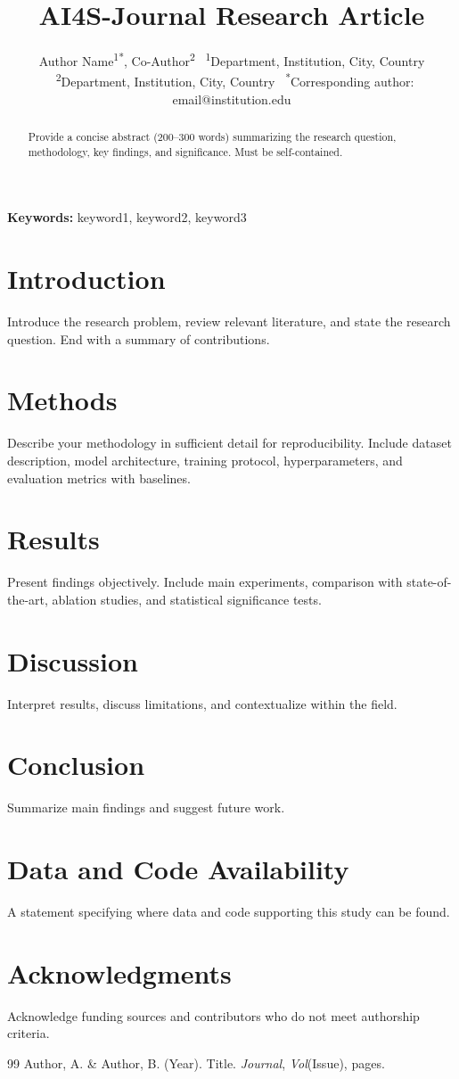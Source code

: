 \documentclass[12pt,a4paper]{article}
\title{\textbf{\textcolor{ai4sgold}{AI4S-Journal} Research Article}}
\author{Author Name\textsuperscript{1*}, Co-Author\textsuperscript{2} \
\textsuperscript{1}Department, Institution, City, Country \
\textsuperscript{2}Department, Institution, City, Country \
\textsuperscript{*}Corresponding author: email@institution.edu}
\date{}
\begin{document}
\maketitle

\begin{abstract}
Provide a concise abstract (200--300 words) summarizing the research question,
methodology, key findings, and significance. Must be self-contained.
\end{abstract}
\noindent\textbf{Keywords:} keyword1, keyword2, keyword3

\section{Introduction}
Introduce the research problem, review relevant literature, and state the
research question. End with a summary of contributions.

\section{Methods}
Describe your methodology in sufficient detail for reproducibility. Include
dataset description, model architecture, training protocol, hyperparameters,
and evaluation metrics with baselines.

\section{Results}
Present findings objectively. Include main experiments, comparison with
state-of-the-art, ablation studies, and statistical significance tests.

\section{Discussion}
Interpret results, discuss limitations, and contextualize within the field.

\section{Conclusion}
Summarize main findings and suggest future work.

\section*{Data and Code Availability}
A statement specifying where data and code supporting this study can be found.

\section*{Acknowledgments}
Acknowledge funding sources and contributors who do not meet authorship criteria.


\begin{thebibliography}{99}
 Author, A. \& Author, B. (Year). Title. \textit{Journal}, \textit{Vol}(Issue), pages.
\end{thebibliography}
\end{document}
